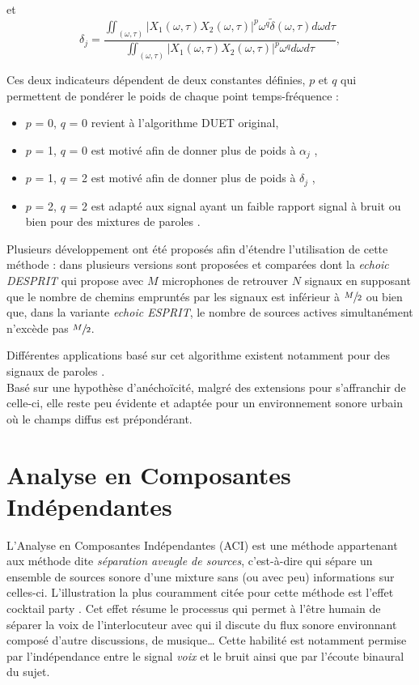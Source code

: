 et 
\begin{equation}
\delta_j = \frac{\iint_{(\omega,\tau)} \vert X_1(\omega,\tau) X_2(\omega,\tau)\vert ^p \omega^q \tilde{\delta}(\omega,\tau) d\omega d\tau}{\iint_{(\omega,\tau)}\vert X_1(\omega,\tau) X_2(\omega,\tau)\vert ^p \omega^q d\omega d\tau},
\end{equation}

Ces deux indicateurs dépendent de deux constantes définies, $p$ et $q$ qui permettent de pondérer le poids de chaque point temps-fréquence : 

\begin{itemize}
\item $p$ = 0, $q$ = 0 revient à l'algorithme DUET original,
\item $p$ = 1, $q$ = 0 est motivé afin de donner plus de poids à $\alpha_j$ \cite{yilmaz2004blind},
\item $p$ = 1, $q$ = 2 est motivé afin de donner plus de poids à $\delta_j$ \cite{yilmaz2004blind},
\item $p$ = 2, $q$ = 2 est adapté aux signal ayant un faible rapport signal à bruit ou bien pour des mixtures de paroles \cite{melia2007underdetermined}.\\
\end{itemize}


Plusieurs développement ont été proposés afin d'étendre l'utilisation de cette méthode : dans  \cite{melia2007underdetermined} plusieurs versions sont proposées et comparées dont la \textit{echoic DESPRIT} qui propose avec $M$ microphones de retrouver $N$ signaux en supposant que le nombre de chemins empruntés par les signaux est inférieur à $\sfrac{M}{2}$ ou bien que, dans la variante \textit{echoic ESPRIT}, le nombre de sources actives simultanément n'excède pas $\sfrac{M}{2}$.

Différentes applications basé sur cet algorithme existent notamment pour des signaux de paroles \cite{yilmaz2004blind, jourjine2000blind}. \\

Basé sur une hypothèse d'anéchoïcité, malgré des extensions pour s'affranchir de celle-ci, elle reste peu évidente et adaptée pour un environnement sonore urbain où le champs diffus est prépondérant.

\section{Analyse en Composantes Indépendantes}
L'Analyse en Composantes Indépendantes (ACI) \cite{comon_independent_1994, jutten1991blind} est une méthode appartenant aux méthode dite \textit{séparation aveugle de sources}, c'est-à-dire qui sépare un ensemble de sources sonore d'une mixture sans (ou avec peu) informations sur celles-ci. L'illustration la plus couramment citée pour cette méthode est l'effet \og cocktail party \fg{}. Cet effet résume le processus qui permet à l'être humain de séparer la voix de l'interlocuteur avec qui il discute du flux sonore environnant composé d'autre discussions, de musique\dots{} Cette habilité est notamment permise par l'indépendance entre le signal \textit{voix} et le bruit ainsi que par l'écoute binaural du sujet.\\

